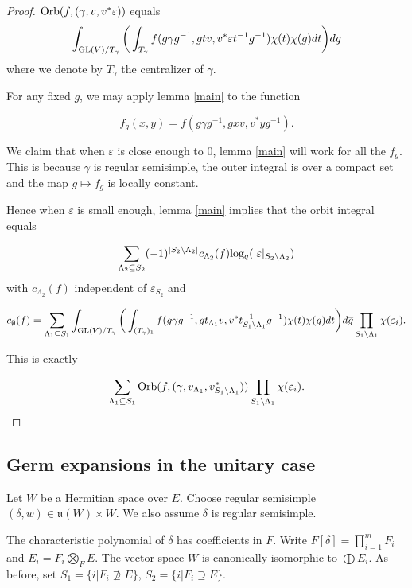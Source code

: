 \documentclass[11pt, oneside,reqno]{amsart}   	%
\begin{document}
 \begin{proof}
 
$ \textup{Orb}(f,(\gamma,v,v^*\varepsilon))$ equals $$\int_{\textup{GL}(V)/T_\gamma} \bigg(\int_{T_\gamma}f(g\gamma g^{-1},gtv,v^*\varepsilon t^{-1}g^{-1})\chi(t)\chi(g)dt\bigg)dg$$
where we denote by $T_\gamma$ the centralizer of $\gamma$.
 
 For any fixed $g$, we may apply lemma \ref{main} to the function 
 
 $$f_g(x,y) = f(g\gamma g^{-1},gxv,v^*y g^{-1}).$$
 
 We claim that when $\varepsilon$ is close enough to $0$, lemma \ref{main} will work for all the $f_g$. This is because $\gamma$ is regular semisimple, the outer integral is over a compact set and the map $g \mapsto f_g$ is locally constant.
 
Hence when $\varepsilon$ is small enough, lemma \ref{main} implies that the orbit integral equals
 
 $$\sum_{\Lambda_2 \subseteq S_2}(-1)^{|S_2 \backslash \Lambda_2|} c_{\Lambda_2}(f) \textup{log$_q$}(|\varepsilon|_{S_2 \backslash \Lambda_2}) $$
with $c_{\Lambda_2}(f)$ independent of $\varepsilon_{S_2}$ and
 
 
 $$ c_\emptyset(f)=\sum_{\Lambda_1 \subseteq S_1} \int_{\textup{GL}(V)/T_\gamma} \bigg(\int_{(T_\gamma)_1} f(g \gamma g^{-1}, gt_{\Lambda_1}v,v^*t^{-1}_{S_1 \backslash \Lambda_1}g^{-1})\chi(t)\chi(g)dt\bigg)d\overline{g} \prod_{S_1 \backslash \Lambda_1}\chi(\varepsilon_i).$$
 
 This is exactly
 
 $$\sum_{\Lambda_1 \subseteq S_1}  \textup{Orb}(f,(\gamma,v_{\Lambda_1},v_{S_1 \backslash \Lambda_1}^*))\prod_{S_1 \backslash \Lambda_1}\chi(\varepsilon_i).$$
 
 \end{proof}
 
 \subsection{Germ expansions in the unitary case} \label{unitary germ}

Let $W$ be a Hermitian space over $E$. Choose regular semisimple $(\delta, w) \in \mathfrak{u}(W) \times W$. We also assume $\delta$ is regular semisimple. 

The characteristic polynomial of $\delta$ has coefficients in $F$. Write $F[\delta]=\prod_{i=1}^m F_i$ and $E_i=F_i \bigotimes_F E$. The vector space $W$ is canonically isomorphic to $\bigoplus E_i$.  As before, set $S_1=\{i | F_i \nsupseteq E\}$, $S_2=\{i | F_i \supseteq E\}$. 
\end{document}
